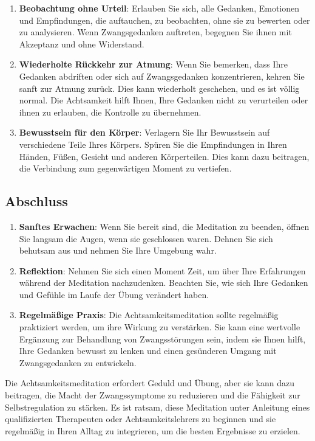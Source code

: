 \begin{enumerate}
  \item \textbf{Beobachtung ohne Urteil}: Erlauben Sie sich, alle Gedanken, Emotionen und Empfindungen, die auftauchen, zu beobachten, ohne sie zu bewerten oder zu analysieren. Wenn Zwangsgedanken auftreten, begegnen Sie ihnen mit Akzeptanz und ohne Widerstand.
  
  \item \textbf{Wiederholte Rückkehr zur Atmung}: Wenn Sie bemerken, dass Ihre Gedanken abdriften oder sich auf Zwangsgedanken konzentrieren, kehren Sie sanft zur Atmung zurück. Dies kann wiederholt geschehen, und es ist völlig normal. Die Achtsamkeit hilft Ihnen, Ihre Gedanken nicht zu verurteilen oder ihnen zu erlauben, die Kontrolle zu übernehmen.
  
  \item \textbf{Bewusstsein für den Körper}: Verlagern Sie Ihr Bewusstsein auf verschiedene Teile Ihres Körpers. Spüren Sie die Empfindungen in Ihren Händen, Füßen, Gesicht und anderen Körperteilen. Dies kann dazu beitragen, die Verbindung zum gegenwärtigen Moment zu vertiefen.
\end{enumerate}

\subsection{Abschluss}

\begin{enumerate}
  \item \textbf{Sanftes Erwachen}: Wenn Sie bereit sind, die Meditation zu beenden, öffnen Sie langsam die Augen, wenn sie geschlossen waren. Dehnen Sie sich behutsam aus und nehmen Sie Ihre Umgebung wahr.
  
  \item \textbf{Reflektion}: Nehmen Sie sich einen Moment Zeit, um über Ihre Erfahrungen während der Meditation nachzudenken. Beachten Sie, wie sich Ihre Gedanken und Gefühle im Laufe der Übung verändert haben.
  
  \item \textbf{Regelmäßige Praxis}: Die Achtsamkeitsmeditation sollte regelmäßig praktiziert werden, um ihre Wirkung zu verstärken. Sie kann eine wertvolle Ergänzung zur Behandlung von Zwangsstörungen sein, indem sie Ihnen hilft, Ihre Gedanken bewusst zu lenken und einen gesünderen Umgang mit Zwangsgedanken zu entwickeln.
\end{enumerate}

Die Achtsamkeitsmeditation erfordert Geduld und Übung, aber sie kann dazu beitragen, die Macht der Zwangssymptome zu reduzieren und die Fähigkeit zur Selbstregulation zu stärken. Es ist ratsam, diese Meditation unter Anleitung eines qualifizierten Therapeuten oder Achtsamkeitslehrers zu beginnen und sie regelmäßig in Ihren Alltag zu integrieren, um die besten Ergebnisse zu erzielen.

